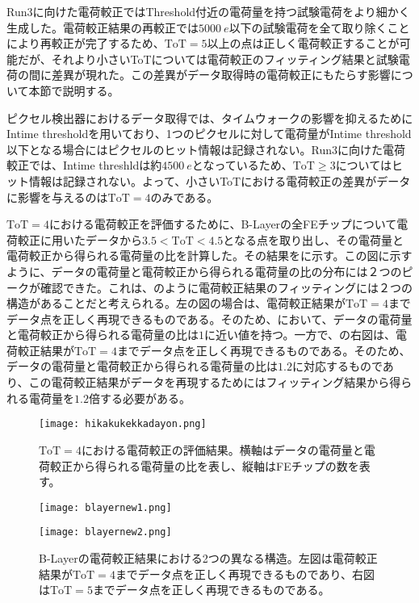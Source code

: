 Run3に向けた電荷較正ではThreshold付近の電荷量を持つ試験電荷をより細かく生成した。電荷較正結果の再較正では$5000\ \si{e}$以下の試験電荷を全て取り除くことにより再較正が完了するため、$\mathrm{ToT}=5$以上の点は正しく電荷較正することが可能だが、それより小さいToTについては電荷較正のフィッティング結果と試験電荷の間に差異が現れた。この差異がデータ取得時の電荷較正にもたらす影響について本節で説明する。

ピクセル検出器におけるデータ取得では、タイムウォークの影響を抑えるためにIntime thresholdを用いており、1つのピクセルに対して電荷量がIntime threshold以下となる場合にはピクセルのヒット情報は記録されない。Run3に向けた電荷較正では、Intime threshldは約$4500\ \si{e}$となっているため、$\mathrm{ToT}\geq3$についてはヒット情報は記録されない。よって、小さいToTにおける電荷較正の差異がデータに影響を与えるのは$\mathrm{ToT}=4$のみである。

$\mathrm{ToT}=4$における電荷較正を評価するために、B-Layerの全FEチップについて電荷較正に用いたデータから$3.5 < \mathrm{ToT} < 4.5$となる点を取り出し、その電荷量と電荷較正から得られる電荷量の比を計算した。その結果をに示す。この図に示すように、データの電荷量と電荷較正から得られる電荷量の比の分布には２つのピークが確認できた。これは、のように電荷較正結果のフィッティングには２つの構造があることだと考えられる。左の図の場合は、電荷較正結果が$\mathrm{ToT}=4$までデータ点を正しく再現できるものである。そのため、において、データの電荷量と電荷較正から得られる電荷量の比は$1$に近い値を持つ。一方で、の右図は、電荷較正結果が$\mathrm{ToT}=4$までデータ点を正しく再現できるものである。そのため、データの電荷量と電荷較正から得られる電荷量の比は$1.2$に対応するものであり、この電荷較正結果がデータを再現するためにはフィッティング結果から得られる電荷量を$1.2$倍する必要がある。

\begin{figure}[tbp]
  \centering
  \texttt{[image: hikakukekkadayon.png]}
  \caption[$\mathrm{ToT}=4$における電荷較正の評価結果]{$\mathrm{ToT}=4$における電荷較正の評価結果。横軸はデータの電荷量と電荷較正から得られる電荷量の比を表し、縦軸はFEチップの数を表す。}
  \label{fig:hikakukekkadayon}
\end{figure}

\begin{figure}[tbp]
  \begin{minipage}[b]{0.5\linewidth}
    \centering
    \texttt{[image: blayernew1.png]}
  \end{minipage}
  \begin{minipage}[b]{0.5\linewidth}
    \centering
    \texttt{[image: blayernew2.png]}
  \end{minipage}
  \caption[B-Layerの電荷較正結果における2つの異なる構造]{B-Layerの電荷較正結果における2つの異なる構造。左図は電荷較正結果が$\mathrm{ToT}=4$までデータ点を正しく再現できるものであり、右図は$\mathrm{ToT}=5$までデータ点を正しく再現できるものである。}
  \label{fig:blayernew}
\end{figure}

